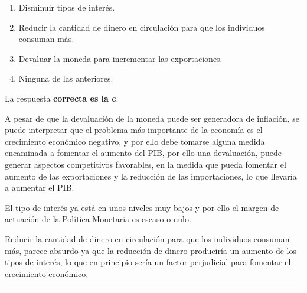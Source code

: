 \documentclass[
  letterpaper,
  DIV=11,
  numbers=noendperiod]{scrreprt}
\begin{document}
\begin{enumerate}
\def\labelenumi{\alph{enumi})}
\item
  Disminuir tipos de interés.
\item
  Reducir la cantidad de dinero en circulación para que los individuos
  consuman más.
\item
  Devaluar la moneda para incrementar las exportaciones.
\item
  Ninguna de las anteriores.
\end{enumerate}

\begin{tcolorbox}[enhanced jigsaw, left=2mm, breakable, arc=.35mm, opacityback=0, toprule=.15mm, rightrule=.15mm, leftrule=.75mm, bottomrule=.15mm, colframe=quarto-callout-tip-color-frame, colback=white]
\begin{minipage}[t]{5.5mm}
\textcolor{quarto-callout-tip-color}{\faLightbulb}
\end{minipage}%
\begin{minipage}[t]{\textwidth - 5.5mm}

La respuesta \textbf{correcta es la c}.

A pesar de que la devaluación de la moneda puede ser generadora de
inflación, se puede interpretar que el problema más importante de la
economía es el crecimiento económico negativo, y por ello debe tomarse
alguna medida encaminada a fomentar el aumento del PIB, por ello una
devaluación, puede generar aspectos competitivos favorables, en la
medida que pueda fomentar el aumento de las exportaciones y la reducción
de las importaciones, lo que llevaría a aumentar el PIB.

El tipo de interés ya está en unos niveles muy bajos y por ello el
margen de actuación de la Política Monetaria es escaso o nulo.

Reducir la cantidad de dinero en circulación para que los individuos
consuman más, parece absurdo ya que la reducción de dinero produciría un
aumento de los tipos de interés, lo que en principio sería un factor
perjudicial para fomentar el crecimiento económico.

\end{minipage}%
\end{tcolorbox}

\begin{center}\rule{0.5\linewidth}{0.5pt}\end{center}
\end{document}
